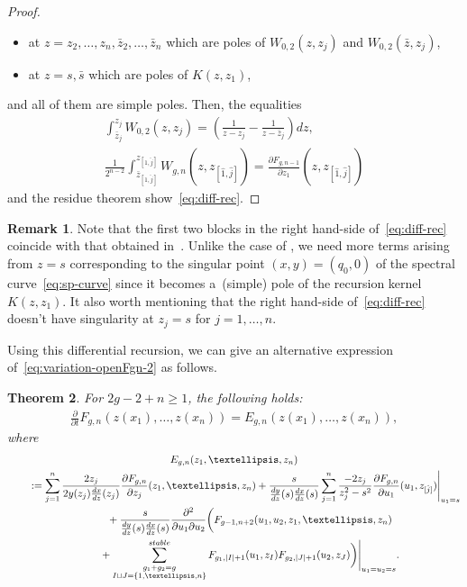 \documentclass[11pt]{article}
\newtheorem{thm}{Theorem}[section]
\theoremstyle{definition}
\newtheorem{rem}[thm]{Remark}
\numberwithin{equation}{section}
\def\p{\partial}
\begin{document}
\begin{proof}
\begin{itemize}
\item
at $z = z_{2}, \dots, z_{n}, \bar{z}_{2}, \dots, \bar{z}_{n}$
which are poles of $W_{0,2}(z,z_{j})$ and $W_{0,2}(\bar{z},z_{j})$,
\item
at $z = s, \bar{s}$ which are poles of $K(z,z_{1})$,
\end{itemize}
and all of them are simple poles.
Then, the equalities
\begin{gather*}
\int^{z_{j}}_{\bar{z}_{j}} W_{0,2}(z,z_{j})   =
\left(\frac{1}{z-z_{j}} - \frac{1}{z-\bar{z}_{j}} \right)dz, \\
\frac{1}{2^{n-2}}
\int^{z_{[\hat{1}, \hat{j}]}}_{\bar{z}_{[\hat{1}, \hat{j}]}}
W_{g,n}(z,z_{[\hat{1}, \hat{j}]})   =
\frac{\p F_{g,n-1}}{\p z_{1}}(z,z_{[\hat{1}, \hat{j}]})
\end{gather*}
and the residue theorem show~\eqref{eq:diff-rec}.
\end{proof}

\begin{rem} \label{rem:difference-from-DM}
Note that the f\/irst two blocks in the right hand-side
of~\eqref{eq:diff-rec} coincide with that obtained
in~\cite{DM14, DM14-2}.
Unlike the case of \cite{DM14, DM14-2},
we need more terms arising from $z=s$ corresponding
to the singular point $(x,y)=(q_{0},0)$
of the spectral curve~\eqref{eq:sp-curve}
since it becomes a~(simple) pole of
the recursion kernel $K(z,z_{1})$.
It also worth mentioning that the
right hand-side of~\eqref{eq:diff-rec} doesn't have
singularity at $z_{j} = s$ for $j=1,\dots,n$.
\end{rem}

Using this dif\/ferential recursion, we can give
an alternative expression of~\eqref{eq:variation-openFgn-2}
as follows.

\begin{thm} \label{thm:variation-of-open-free-energy}
For $2g-2+n \ge 1$, the following holds:
\begin{gather} \label{eq:t-derivative-recursion}
\frac{\p }{\p t} F_{g,n}(z(x_{1}),\dots,z(x_{n}))
= E_{g,n}(z(x_{1}),\dots,z(x_{n})),
\end{gather}
where
\begin{gather}
E_{g,n}(z_{1},\dots,z_{n}) \nonumber\\
\qquad{}
:=\sum_{j=1}^{n}
\frac{2z_{j}}{2y(z_{j})\frac{dx}{dz}(z_{j})}
\frac{\p F_{g,n}}{\p z_{j}}(z_{1},\dots,z_{n}) +
\frac{s}{\frac{dy}{dz}(s) \frac{dx}{dz}(s)}
\sum_{j=1}^{n} \frac{-2 z_{j}}{z_{j}^{2}-s^{2}}
\frac{\p F_{g,n}}{\p u_{1}}(u_{1},z_{[\hat{j}]})
\Biggr|_{u_{1}=s}
\nonumber\\
\qquad\quad{}+ \frac{s}{\frac{dy}{dz}(s) \frac{dx}{dz}(s)}
\frac{\p^{2}}{\p u_{1} \p u_{2}}
\biggl( F_{g-1,n+2}(u_{1},u_{2},z_{1},\dots,z_{n})
\nonumber\\
\qquad\quad{}+ \sum_{\substack{g_{1}+g_{2}=g \\
I \sqcup J = \{1,\dots,n\}}}^{\rm stable}
F_{g_{1}, |I|+1}(u_{1},z_{I}) F_{g_{2}, |J|+1}(u_{2}, z_{J})
\biggr)\Biggr|_{u_{1}=u_{2}=s}.\label{eq:Egn}
\end{gather}
\end{thm}
\end{document}

